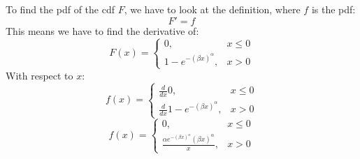 To find the pdf of the cdf $F$, we have to look at the definition, where $f$ is the pdf:
$$
F' = f
$$
This means we have to find the derivative of:
$$
F(x) =
\left\{
\begin{array}{ll}
0, & x \leq 0 \\
1 - e^{- (\beta x)^\alpha}, & x > 0
\end{array}
\right.
$$
With respect to $x$:
$$
f(x) =
\left\{
\begin{array}{ll}
\frac{d}{dx} 0, & x \leq 0 \\
\frac{d}{dx} 1 - e^{- (\beta x)^\alpha}, & x > 0
\end{array}
\right.
$$
$$
f(x) =
\left\{
\begin{array}{ll}
0, & x \leq 0 \\
\frac{\alpha e^{-(\beta x)^\alpha} (\beta x)^\alpha}{x}, & x > 0
\end{array}
\right.
$$